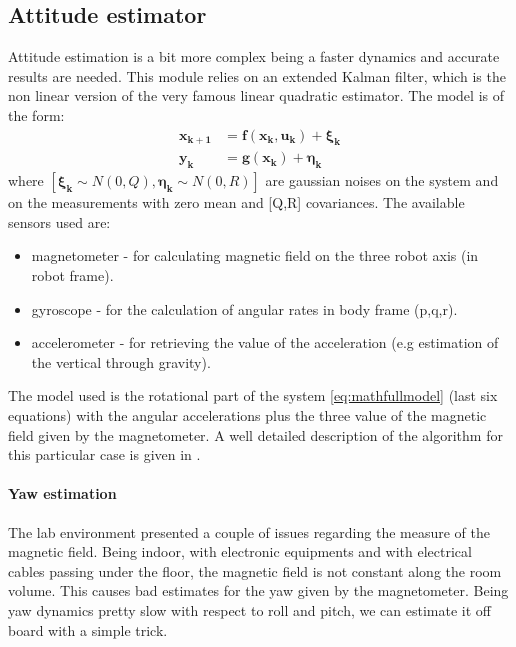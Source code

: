\subsection{Attitude estimator}

Attitude estimation is a bit more complex being a faster dynamics and accurate results are needed. This module relies on an extended Kalman filter, which is the non linear version of the very famous linear quadratic estimator. The model is of the form:
\begin{equation}
	\begin{aligned}
	\boldsymbol{x_{k+1}}& = \boldsymbol{f(\boldsymbol{x_k}, \boldsymbol{u_k})} + \boldsymbol{\xi_k} \\
	\boldsymbol{y_k}& = \boldsymbol{ g(\boldsymbol{x_k}) } + \boldsymbol{\eta_k}
	\end{aligned}
\end{equation}
where $[\boldsymbol{\xi_k} \sim N(0,Q), \boldsymbol{\eta_k} \sim N(0,R) ]$ are gaussian noises on the system and on the measurements with zero mean and [Q,R] covariances. The available sensors used are: \begin{itemize}
	\item magnetometer - for calculating magnetic field on the three robot axis (in robot frame).
	\item gyroscope - for the calculation of angular rates in body frame (p,q,r).
	\item accelerometer - for retrieving the value of the acceleration (e.g estimation of the vertical through gravity).
	\end{itemize}

\noindent
The model used is the rotational part of the system \ref{eq:mathfullmodel} (last six equations) with the angular accelerations plus the three value of the magnetic field given by the magnetometer. A well detailed description of the algorithm for this particular case is given in \cite{attekf}.

\noindent
\paragraph{Yaw estimation} The lab environment presented a couple of issues regarding the measure of the magnetic field. Being indoor, with electronic equipments and with electrical cables passing under the floor, the magnetic field is not constant along the room volume. This causes bad estimates for the yaw given by the magnetometer. Being yaw dynamics pretty slow with respect to roll and pitch, we can estimate it off board with a simple trick.\\

